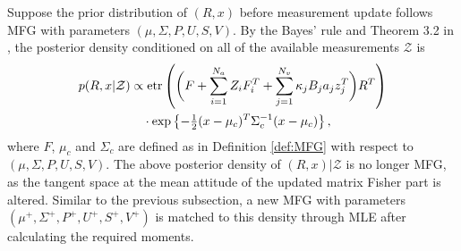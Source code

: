 Suppose the prior distribution of $(R,x)$ before measurement update follows MFG with parameters $(\mu,\Sigma,P,U,S,V)$. 
By the Bayes' rule and Theorem 3.2 in \cite{lee2018bayesian}, the posterior density conditioned on all of the available measurements $\mathcal{Z}$ is 
\begin{align} \label{eqn:attEst-update-density}
	p(R,x\lvert \mathcal{Z}) & \propto \mathrm{etr}\left(  \bigg( F + \sum_{i=1}^{N_a}Z_iF_i^T + \sum_{j=1}^{N_v}\kappa_jB_ja_jz_j^T \bigg)R^T  \right) \nonumber \\
	&\quad \cdot \exp\left\{ -\tfrac{1}{2}(x-\mu_c)^T\Sigma_c^{-1}(x-\mu_c) \right\},
\end{align}
where $F$, $\mu_c$ and $\Sigma_c$ are defined as in Definition \ref{def:MFG} with respect to $(\mu,\Sigma,P,U,S,V)$.
The above posterior density of $(R,x)\lvert \mathcal{Z}$ is no longer MFG, as the tangent space at the mean attitude of the updated matrix Fisher part is altered.
Similar to the previous subsection, a new MFG with parameters $(\mu^+,\Sigma^+,P^+,U^+,S^+,V^+)$ is matched to this density through MLE after calculating the required moments.

